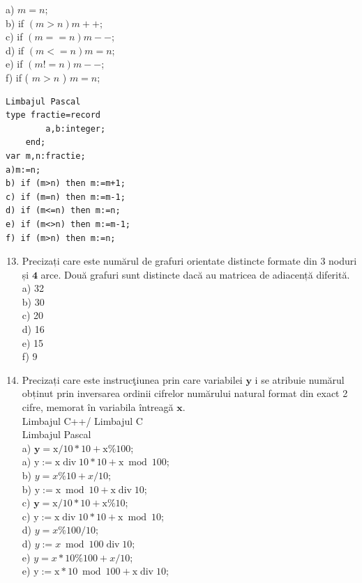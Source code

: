 \documentclass[10pt]{article}
\begin{document}
a) $m=n$;\\
b) if $(m>n) m++;$\\
c) if $(m==n) m--$;\\
d) if $(m<=n) m=n$;\\
e) if $(m!=n) m--$;\\
f) if ( $m>n$ ) $m=n$;

\begin{verbatim}
Limbajul Pascal
type fractie=record
        a,b:integer;
    end;
var m,n:fractie;
a)m:=n;
b) if (m>n) then m:=m+1;
c) if (m=n) then m:=m-1;
d) if (m<=n) then m:=n;
e) if (m<>n) then m:=m-1;
f) if (m>n) then m:=n;
\end{verbatim}

\begin{enumerate}
  \setcounter{enumi}{12}
  \item Precizați care este numărul de grafuri orientate distincte formate din 3 noduri și $\mathbf{4}$ arce. Două grafuri sunt distincte dacă au matricea de adiacență diferită.\\
a) 32\\
b) 30\\
c) 20\\
d) 16\\
e) 15\\
f) 9
  \item Precizați care este instrucţiunea prin care variabilei $\mathbf{y}$ i se atribuie numărul obținut prin inversarea ordinii cifrelor numărului natural format din exact 2 cifre, memorat în variabila întreagă $\mathbf{x}$.\\
Limbajul C++/ Limbajul C\\
Limbajul Pascal\\
a) $\mathbf{y}=\mathrm{x} / 10 * 10+\mathrm{x} \% 100$;\\
a) $\mathrm{y}:=\mathrm{x} \operatorname{div} 10 * 10+\mathrm{x} \bmod 100$;\\
b) $y=x \% 10+x / 10$;\\
b) $\mathrm{y}:=\mathrm{x} \bmod 10+\mathrm{x} \operatorname{div} 10$;\\
c) $\mathbf{y}=\mathrm{x} / 10 * 10+\mathrm{x} \% 10$;\\
c) $\mathrm{y}:=\mathrm{x} \operatorname{div} 10 * 10+\mathrm{x} \bmod 10$;\\
d) $y=x \% 100 / 10$;\\
d) $y:=x \bmod 100 \operatorname{div} 10 ;$\\
e) $y=x * 10 \% 100+x / 10$;\\
e) $\mathrm{y}:=\mathrm{x} * 10 \bmod 100+\mathrm{x} \operatorname{div} 10$;\\

\end{enumerate}
\end{document}
